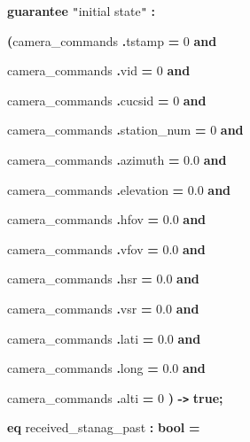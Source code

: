 \begin{figure}
{{\vspace{12pt}
{\color{color18} \textbf{guarantee}} {\color{color19} \texttt{"}initial state\texttt{"}} 
{\color{color18} \textbf{:}}    

{\color{color18} \textbf{(}}camera\_commands{\color{color18} \textbf{.}}tstamp 
{\color{color18} \textbf{=}} 0 {\color{color18} \textbf{and   }}

\parindent=10pt
camera\_commands{\color{color18} \textbf{.}}vid {\color{color18} \textbf{=}} 0 
{\color{color18} \textbf{and   }}

camera\_commands{\color{color18} \textbf{.}}cucsid {\color{color18} \textbf{=}} 
0 {\color{color18} \textbf{and   }}

camera\_commands{\color{color18} \textbf{.}}station\_num {\color{color18} \textbf{=}} 
0 {\color{color18} \textbf{and   }}

camera\_commands{\color{color18} \textbf{.}}azimuth {\color{color18} \textbf{=}} 
0.0 {\color{color18} \textbf{and   }}

camera\_commands{\color{color18} \textbf{.}}elevation {\color{color18} \textbf{=}} 
0.0 {\color{color18} \textbf{and   }}

camera\_commands{\color{color18} \textbf{.}}hfov {\color{color18} \textbf{=}} 0.0 
{\color{color18} \textbf{and   }}

camera\_commands{\color{color18} \textbf{.}}vfov {\color{color18} \textbf{=}} 0.0 
{\color{color18} \textbf{and   }}

camera\_commands{\color{color18} \textbf{.}}hsr {\color{color18} \textbf{=}} 0.0 
{\color{color18} \textbf{and   }}

camera\_commands{\color{color18} \textbf{.}}vsr {\color{color18} \textbf{=}} 0.0 
{\color{color18} \textbf{and   }}

camera\_commands{\color{color18} \textbf{.}}lati {\color{color18} \textbf{=}} 0.0 
{\color{color18} \textbf{and   }}

camera\_commands{\color{color18} \textbf{.}}long {\color{color18} \textbf{=}} 0.0 
{\color{color18} \textbf{and   }}

camera\_commands{\color{color18} \textbf{.}}alti {\color{color18} \textbf{=}} 0{\color{color18} \textbf{)}} 
{\color{color18} \textbf{-\texttt{>}}} {\color{color18} \textbf{true;    }}

\vspace{12pt}
\parindent=0pt
{\color{color18} \textbf{eq}} received\_stanag\_past {\color{color18} \textbf{:}} 
{\color{color18} \textbf{bool}} {\color{color18} \textbf{=}}   

}}
\end{figure}
